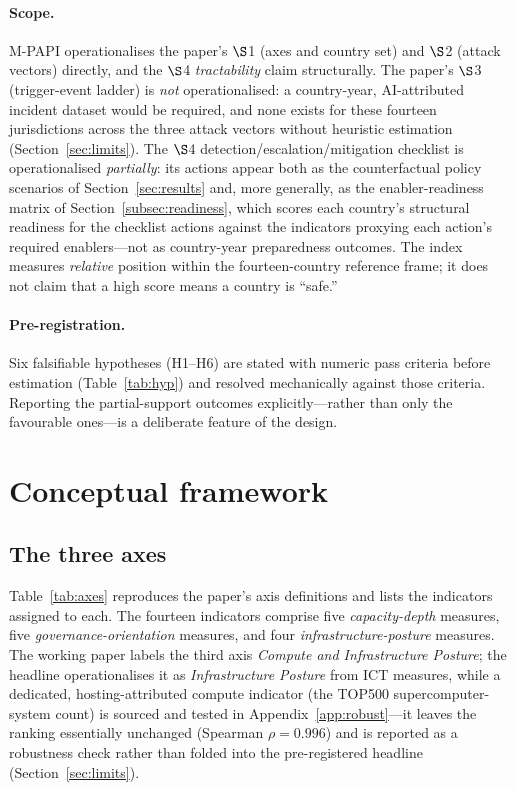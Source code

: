 \documentclass[11pt]{article}
\begin{document}
\paragraph{Scope.} M-PAPI operationalises the paper's $\S$1 (axes and country set) and $\S$2 (attack vectors) directly, and the $\S$4 \emph{tractability} claim structurally. The paper's $\S$3 (trigger-event ladder) is \emph{not} operationalised: a country-year, AI-attributed incident dataset would be required, and none exists for these fourteen jurisdictions across the three attack vectors without heuristic estimation (Section~\ref{sec:limits}). The $\S$4 detection/escalation/mitigation checklist is operationalised \emph{partially}: its actions appear both as the counterfactual policy scenarios of Section~\ref{sec:results} and, more generally, as the enabler-readiness matrix of Section~\ref{subsec:readiness}, which scores each country's structural readiness for the checklist actions against the indicators proxying each action's required enablers---not as country-year preparedness outcomes. The index measures \emph{relative} position within the fourteen-country reference frame; it does not claim that a high score means a country is ``safe.''

\paragraph{Pre-registration.} Six falsifiable hypotheses (H1--H6) are stated with numeric pass criteria before estimation (Table~\ref{tab:hyp}) and resolved mechanically against those criteria. Reporting the partial-support outcomes explicitly---rather than only the favourable ones---is a deliberate feature of the design.

\section{Conceptual framework}\label{sec:framework}
\subsection{The three axes}
Table~\ref{tab:axes} reproduces the paper's axis definitions and lists the indicators assigned to each. The fourteen indicators comprise five \emph{capacity-depth} measures, five \emph{governance-orientation} measures, and four \emph{infrastructure-posture} measures. The working paper labels the third axis \emph{Compute and Infrastructure Posture}; the headline operationalises it as \emph{Infrastructure Posture} from ICT measures, while a dedicated, hosting-attributed compute indicator (the TOP500 supercomputer-system count) is sourced and tested in Appendix~\ref{app:robust}---it leaves the ranking essentially unchanged (Spearman $\rho=0.996$) and is reported as a robustness check rather than folded into the pre-registered headline (Section~\ref{sec:limits}).
\end{document}
